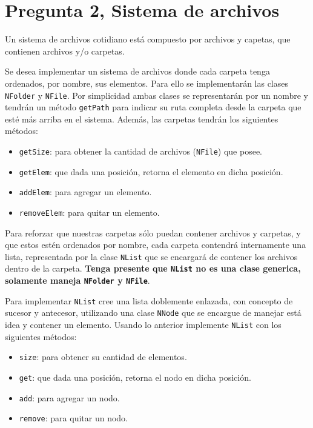 \documentclass[11pt,spanish,letterpaper]{report}
\begin{document}
\section*{Pregunta 2, Sistema de archivos}

Un sistema de archivos cotidiano está compuesto por archivos y capetas, que contienen archivos y/o carpetas.

Se desea implementar un sistema de archivos donde cada carpeta tenga ordenados, por nombre, sus elementos. Para ello se implementarán las clases {\tt NFolder} y {\tt NFile}. Por simplicidad ambas clases se representarán por un nombre y tendrán un método {\tt getPath} para indicar su ruta completa desde la carpeta que esté más arriba en el sistema. Además, las carpetas tendrán los siguientes métodos:

\begin{itemize}
 	\item {\tt getSize}: para obtener la cantidad de archivos ({\tt NFile}) que posee.
 	\item {\tt getElem}: que dada una posición, retorna el elemento en dicha posición.
 	\item {\tt addElem}: para agregar un elemento.
 	\item {\tt removeElem}: para quitar un elemento.
\end{itemize} 

Para reforzar que nuestras carpetas sólo puedan contener archivos y carpetas, y que estos estén ordenados por nombre, cada carpeta contendrá internamente una lista, representada por la clase {\tt NList} que se encargará de contener los archivos dentro de la carpeta. \textbf{Tenga presente que {\tt NList} no es una clase generica, solamente maneja {\tt NFolder} y {\tt NFile}}.

Para implementar {\tt NList} cree una lista doblemente enlazada, con concepto de sucesor y antecesor, utilizando una clase {\tt NNode} que se encargue de manejar está idea y contener un elemento. Usando lo anterior implemente {\tt NList} con los siguientes métodos:

\begin{itemize}
 	\item {\tt size}: para obtener su cantidad de elementos.
 	\item {\tt get}: que dada una posición, retorna el nodo en dicha posición.
 	\item {\tt add}: para agregar un nodo.
 	\item {\tt remove}: para quitar un nodo.
\end{itemize}
\end{document}
